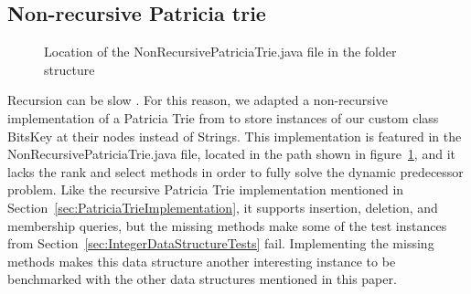 \subsection{Non-recursive Patricia trie}

\begin{figure}[H]
\caption{Location of the {\ttfamily NonRecursivePatriciaTrie.java} file in the folder structure}
\label{fig:NonRecursivePatriciaTrieTree}
\end{figure}

Recursion can be slow \cite{shirazi2003java}. For this reason, we adapted a non-recursive implementation of a Patricia Trie from \cite{patriciaSET} to store instances of our custom class {\ttfamily BitsKey} at their nodes instead of {\ttfamily String}s. This implementation is featured in the {\ttfamily NonRecursivePatriciaTrie.java} file, located in the path shown in figure~\ref{fig:NonRecursivePatriciaTrieTree}, and it lacks the {\ttfamily rank} and {\ttfamily select} methods in order to fully solve the dynamic predecessor problem. Like the recursive Patricia Trie implementation mentioned in Section~\ref{sec:PatriciaTrieImplementation}, it supports insertion, deletion, and membership queries, but the missing methods make some of the test instances from Section~\ref{sec:IntegerDataStructureTests} fail. Implementing the missing methods makes this data structure another interesting instance to be benchmarked with the other data structures mentioned in this paper.
